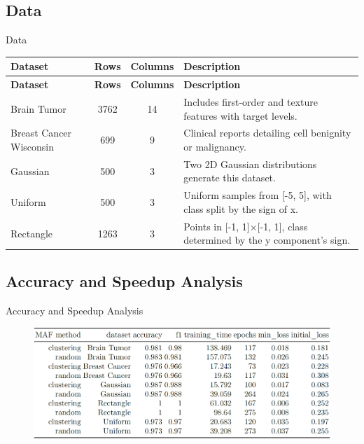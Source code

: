 \documentclass[aspectratio=169]{beamer}
\begin{document}
\subsection{Data}
\begin{frame}{Data}
{\rm
\begin{longtable}{|>{\raggedright\arraybackslash}p{3cm}|c|c|>{\raggedright\arraybackslash}p{5cm}|}
\hline
\textbf{Dataset} & \textbf{Rows} & \textbf{Columns} & \textbf{Description} \\ \hline
\endfirsthead
\hline
\textbf{Dataset} & \textbf{Rows} & \textbf{Columns} & \textbf{Description} \\ \hline
\endhead
Brain Tumor & 3762 & 14 & Includes first-order and texture features with target levels. \\ \hline
Breast Cancer Wisconsin & 699 & 9 & Clinical reports detailing cell benignity or malignancy. \\ \hline
Gaussian & 500 & 3 & Two 2D Gaussian distributions generate this dataset. \\ \hline
Uniform & 500 & 3 & Uniform samples from [-5, 5], with class split by the sign of x. \\ \hline
Rectangle & 1263 & 3 & Points in [-1, 1]×[-1, 1], class determined by the y component's sign. \\ \hline
\end{longtable}
}
\end{frame}

\subsection{Accuracy and Speedup Analysis}
\begin{frame}{Accuracy and Speedup Analysis}
\begin{figure}
    \centering
    \includegraphics[width=0.95\linewidth]{../../fig/acc_speedup_table.png}
    \label{fig:acc_speedup_table}
\end{figure}
\end{frame}
\end{document}
